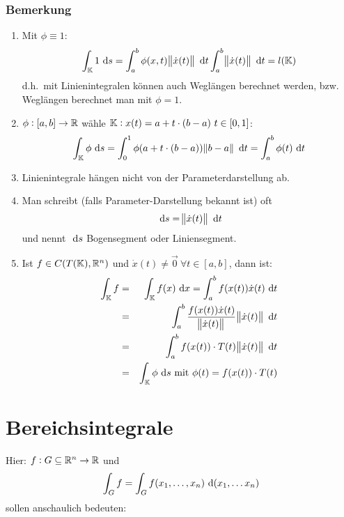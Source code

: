 \subsubsection{Bemerkung}
\begin{enumerate}[label= (\alph*)]
    \item
        Mit $\phi \equiv 1$:
        \begin{equation*}
            \int_{\mathbb{K}} 1 \text{ d}s = \int_a^b \phi(x,t) \norm{\dot{x}(t)} \text{ d}t
            \int_a^b  \norm{\dot{x}(t)} \text{ d}t = l(\mathbb{K})
        \end{equation*}
        d.h.\ mit Linienintegralen können auch Weglängen berechnet werden,
        bzw. Weglängen berechnet man mit $\phi = 1$.
    \item
        $\phi: [a,b] \rightarrow \mathbb{R}$ wähle $\mathbb{K}: x(t) = a + t \cdot (b-a)\
        t \in [0,1]$:
        \begin{equation*}
            \int_{\mathbb{K}} \phi \text{ d}s = \int_0^1 \phi (a + t \cdot (b-a)) \norm{b-a} \text{ d}t
            = \int_a^b \phi(t) \text{ d}t
        \end{equation*}
    \item Linienintegrale hängen nicht von der Parameterdarstellung ab.
    \item Man schreibt (falls Parameter-Darstellung bekannt ist) oft
        \begin{equation*}
            \text{ d}s = \norm{\dot{x}(t)} \text{ d}t
        \end{equation*}
        und nennt $\text{ d}s$ Bogensegment oder Liniensegment.
    \item Ist $f \in C(T(\mathbb{K}), \mathbb{R}^n)$ und $\dot{x}(t) \neq \vec{0}\ \forall
        t \in [a,b]$, dann ist:
        \begin{eqnarray*}
            \int_{\mathbb{K}} f &=& \int_{\mathbb{K}} f(x) \text{ d}x = \int_a^b f(x(t)) \dot{x}(t) \text{ d}t \\
            &=& \int_a^b \frac{f(x(t)) \dot{x}(t)}{\norm{\dot{x}(t)}} \norm{\dot{x}(t)}
            \text{ d}t \\ &=& \int_a^b f(x(t)) \cdot T(t) \norm{\dot{x}(t)} \text{ d}t  \\ &=&
            \int_{\mathbb{K}} \phi \text{ d}s \text{ mit } \phi(t) = f(x(t)) \cdot T(t)
        \end{eqnarray*}
\end{enumerate}

\section{Bereichsintegrale}
Hier: $f: G \subseteq \mathbb{R}^n \rightarrow \mathbb{R}$ und
\begin{equation*}
    \int_G f = \int_G f(x_1, \ldots, x_n) \text{ d}(x_1, \ldots x_n)
\end{equation*}
sollen anschaulich bedeuten:


